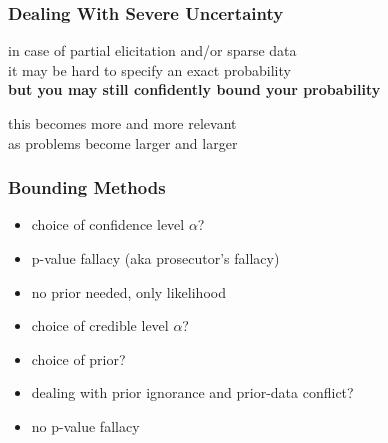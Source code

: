 \documentclass{beamer}
\newcommand{\gplus}{\structure{\textbf{+}}}
\newcommand{\gmins}{\structure{\textbf{--}}}
\begin{document}
\begin{frame}
  \frametitle{Dealing With Severe Uncertainty}
  \begin{alertblock}{}
    in case of \alert{partial elicitation} and/or \alert{sparse data}
    \\
    it may be hard to specify an exact probability
    \\
    \textbf{but you may still confidently bound your probability}
  \end{alertblock}
  \vspace{2em}
  this becomes more and more relevant \\
  as problems become larger and larger
\end{frame}

\begin{frame}
  \frametitle{Bounding Methods} %
    \begin{itemize}
  \setlength{\itemsep}{0pt}
  \setlength{\parskip}{0pt}
  \setlength{\parsep}{0pt}
    \item[\gmins] choice of confidence level $\alpha$?
    \item[\gmins] p-value fallacy (aka prosecutor's fallacy)
    \item[\gplus] no prior needed, only likelihood
    \end{itemize}
  \vspace*{1ex}
\pause
{}
      \begin{itemize}
  \setlength{\itemsep}{0pt}
  \setlength{\parskip}{0pt}
  \setlength{\parsep}{0pt}
      \item[\gmins] choice of credible level $\alpha$?
      \item[\gmins] choice of prior?
      \item[\gmins] dealing with prior ignorance and prior-data conflict?
      \item[\gplus] no p-value fallacy
      \end{itemize}

\end{frame}
\end{document}

